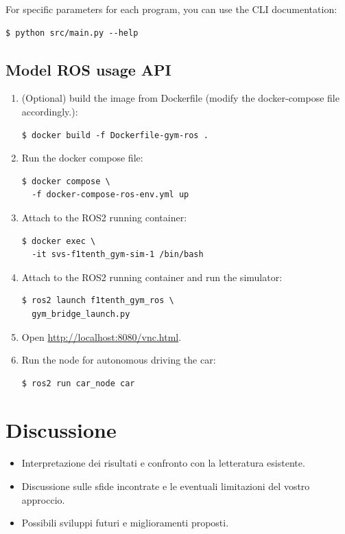 \documentclass[conference]{IEEEtran}
\begin{document}
For specific parameters for each program, you can use the CLI documentation:
\begin{verbatim}
$ python src/main.py --help
\end{verbatim}

%
%
%
\subsection{Model ROS usage API}

\begin{enumerate}
    \item (Optional) build the image from Dockerfile (modify the docker-compose file accordingly.):
\begin{verbatim}
$ docker build -f Dockerfile-gym-ros .
\end{verbatim}

    \item Run the docker compose file:
\begin{verbatim}
$ docker compose \
  -f docker-compose-ros-env.yml up
\end{verbatim}

    \item Attach to the ROS2 running container:
\begin{verbatim}
$ docker exec \
  -it svs-f1tenth_gym-sim-1 /bin/bash
\end{verbatim}

    \item Attach to the ROS2 running container and run the simulator:
\begin{verbatim}
$ ros2 launch f1tenth_gym_ros \
  gym_bridge_launch.py
\end{verbatim}

    \item Open \url{http://localhost:8080/vnc.html}.

    \item Run the node for autonomous driving the car:
\begin{verbatim}
$ ros2 run car_node car
\end{verbatim}
\end{enumerate}

%
%
%
\section{Discussione}

\begin{itemize}
    \item Interpretazione dei risultati e confronto con la letteratura esistente.

    \item Discussione sulle sfide incontrate e le eventuali limitazioni del vostro approccio.

    \item Possibili sviluppi futuri e miglioramenti proposti.

\end{itemize}
\end{document}
